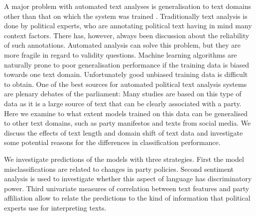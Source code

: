 \documentclass[11pt]{article}
\begin{document}
A major problem with automated text analyses is generalisation to text domains other than that on which the system was trained \cite{Slapin.2014}. 
Traditionally text analysis is done by political experts, who are annotating political text having in mind many context factors. There has, however, always been discussion about the reliability of such annotations. Automated analysis can solve this problem, but they are more fragile in regard to validity questions. 
Machine learning algorithms are naturally prone to poor generalisation performance if the training data is biased towards one text domain. Unfortunately good unbiased training data is difficult to obtain. One of the best sources for automated political text analysis systems are plenary debates of the parliament: Many studies are based on this type of data as it is a large source of text that can be clearly associated with a party. Here we examine to what extent models trained on this data can be generalised to other text domains, such as party manifestos and texts from social media. 
We discuss the effects of text length and domain shift of text data and investigate some potential reasons for the differences in classification performance. 

We investigate predictions of the models with three strategies. First the model misclassifications are related to changes in party policies. Second sentiment analysis is used to investigate whether this aspect of language has discriminatory power. Third univariate measures of correlation between text features and party affiliation allow to relate the predictions to the kind of information that political experts use for interpreting texts. 
\end{document}
